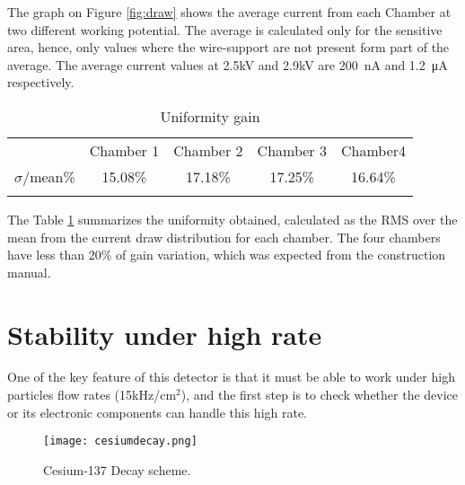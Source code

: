 The graph on Figure \ref{fig:draw} shows the average current from each Chamber at two different working potential. The
average is calculated only for the sensitive area, hence, only values where the wire-support are not present
form part of the average. The average current values at 2.5kV and 2.9kV are \SI{200}{nA} and \SI{1.2}{\micro A} respectively.\par 



\begin{table}
	\centering
	\begin{tabular}{ccccc}
	\hline
	& Chamber 1&Chamber 2 & Chamber 3 & Chamber4\\
	$\sigma$/mean\% 	
	 & 15.08\%  
& 17.18\%  
	 & 17.25\%  
	& 16.64\%  \\
	\hline\\
	\end{tabular}
	\caption{Uniformity gain}\label{table}
\end{table}

The Table \ref{table} summarizes the uniformity obtained, calculated as the RMS over the mean from the current draw
distribution for each chamber. The four chambers have less than 20\% of gain variation, which was expected from the
construction manual.\par



\section{Stability under high rate}\label{gifff}

One of the key feature of this detector is that it must be able to work under high particles flow
rates (\unit{15}{kHz/cm$^2$}), and the first step is
to check whether the device or its electronic components can handle this high rate.\par
\begin{figure}[ht]
	\hspace*{\fill}
	\texttt{[image: cesiumdecay.png]}
	\hspace*{\fill}
	\caption{Cesium-137 Decay scheme.}\label{cesium}
\end{figure}


